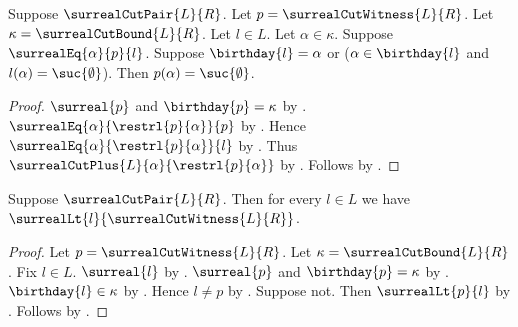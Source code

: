 \begin{lemma}\label{surreal_cut_witness_follows_left_prefix}
    Suppose $\surrealCutPair{L}{R}$.
    Let $p=\surrealCutWitness{L}{R}$.
    Let $\kappa=\surrealCutBound{L}{R}$.
    Let $l\in L$.
    Let $\alpha\in\kappa$.
    Suppose $\surrealEq{\alpha}{p}{l}$.
    Suppose $\birthday{l}=\alpha$ or
        ($\alpha\in\birthday{l}$ and
         $l(\alpha)=\suc{\emptyset}$).
    Then $p(\alpha)=\suc{\emptyset}$.
\end{lemma}
\begin{proof}
    $\surreal{p}$ and $\birthday{p}=\kappa$
        by .
    $\surrealEq{\alpha}{\restrl{p}{\alpha}}{p}$
        by .
    Hence $\surrealEq{\alpha}{\restrl{p}{\alpha}}{l}$
        by .
    Thus $\surrealCutPlus{L}{\alpha}{\restrl{p}{\alpha}}$
        by .
    Follows by .
\end{proof}

\begin{theorem}\label{surreal_cut_witness_left}
    Suppose $\surrealCutPair{L}{R}$.
    Then for every $l\in L$ we have
        $\surrealLt{l}{\surrealCutWitness{L}{R}}$.
\end{theorem}
\begin{proof}
    Let $p=\surrealCutWitness{L}{R}$.
    Let $\kappa=\surrealCutBound{L}{R}$.
    Fix $l\in L$.
    $\surreal{l}$ by .
    $\surreal{p}$ and $\birthday{p}=\kappa$
        by .
    $\birthday{l}\in\kappa$
        by .
    Hence $l\neq p$ by .
    Suppose not.
    Then $\surrealLt{p}{l}$
        by .
    Follows by .
\end{proof}


